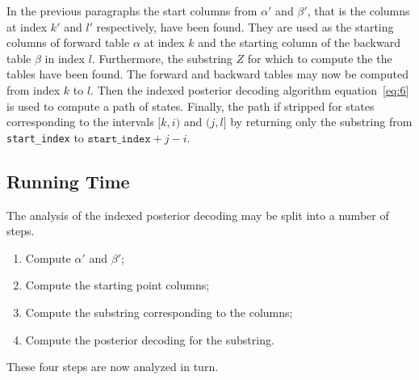 In the previous paragraphs the start columns from $\alpha'$ and $\beta'$, that
is the columns at index $k'$ and $l'$ respectively, have been found. They are
used as the starting columns of forward table $\alpha$ at index $k$ and the
starting column of the backward table $\beta$ in index $l$. Furthermore, the
substring $Z$ for which to compute the the tables have been found. The forward
and backward tables may now be computed from index $k$ to $l$. Then the
indexed posterior decoding algorithm equation~\eqref{eq:6} is used to compute
a path of states. Finally, the path if stripped for states corresponding to the
intervals $[k, i)$ and $(j, l]$ by returning only the substring from \texttt{start\_index}
to $\texttt{start\_index} + j - i$.

\subsection{Running Time}
\label{sec:running-time-2}

The analysis of the indexed posterior decoding may be split into a number of
steps.
\begin{enumerate}
\item Compute $\alpha'$ and $\beta'$;
\item Compute the starting point columns;
\item Compute the substring corresponding to the columns;
\item Compute the posterior decoding for the substring.
\end{enumerate}
These four steps are now analyzed in turn.

